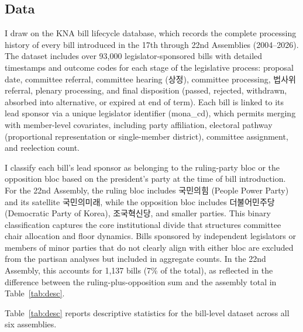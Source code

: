 \documentclass[11pt]{article}
\begin{document}
\subsection{Data}

I draw on the KNA bill lifecycle database, which records the complete processing history of every bill introduced in the 17th through 22nd Assemblies (2004--2026). The dataset includes over 93,000 legislator-sponsored bills with detailed timestamps and outcome codes for each stage of the legislative process: proposal date, committee referral, committee hearing (상정), committee processing, 법사위 referral, plenary processing, and final disposition (passed, rejected, withdrawn, absorbed into alternative, or expired at end of term). Each bill is linked to its lead sponsor via a unique legislator identifier (mona\_cd), which permits merging with member-level covariates, including party affiliation, electoral pathway (proportional representation or single-member district), committee assignment, and reelection count.

I classify each bill's lead sponsor as belonging to the ruling-party bloc or the opposition bloc based on the president's party at the time of bill introduction. For the 22nd Assembly, the ruling bloc includes 국민의힘 (People Power Party) and its satellite 국민의미래, while the opposition bloc includes 더불어민주당 (Democratic Party of Korea), 조국혁신당, and smaller parties. This binary classification captures the core institutional divide that structures committee chair allocation and floor dynamics. Bills sponsored by independent legislators or members of minor parties that do not clearly align with either bloc are excluded from the partisan analyses but included in aggregate counts. In the 22nd Assembly, this accounts for 1,137 bills (7\% of the total), as reflected in the difference between the ruling-plus-opposition sum and the assembly total in Table~\ref{tab:desc}.

Table~\ref{tab:desc} reports descriptive statistics for the bill-level dataset across all six assemblies.
\end{document}
